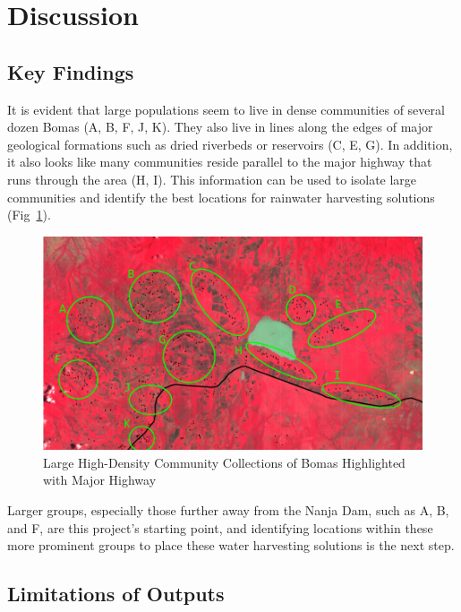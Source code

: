 \documentclass[10pt]{article}
\begin{document}
\section{Discussion}

\subsection{Key Findings}

It is evident that large populations seem to live in dense communities of several dozen Bomas (A, B, F, J, K). They also live in lines along the edges of major geological formations such as dried riverbeds or reservoirs (C, E, G). In addition, it also looks like many communities reside parallel to the major highway that runs through the area (H, I). This information can be used to isolate large communities and identify the best locations for rainwater harvesting solutions (Fig~\ref{fig:Communities and Major Highway}).

\begin{figure} [H]
    \centering
    \includegraphics[width=1\linewidth]{images/Communities and Highway Highlighted.png}
    \caption{Large High-Density Community Collections of Bomas Highlighted with Major Highway}
    \label{fig:Communities and Major Highway}
\end{figure}

Larger groups, especially those further away from the Nanja Dam, such as A, B, and F, are this project's starting point, and identifying locations within these more prominent groups to place these water harvesting solutions is the next step. 

\subsection{Limitations of Outputs}
\end{document}
